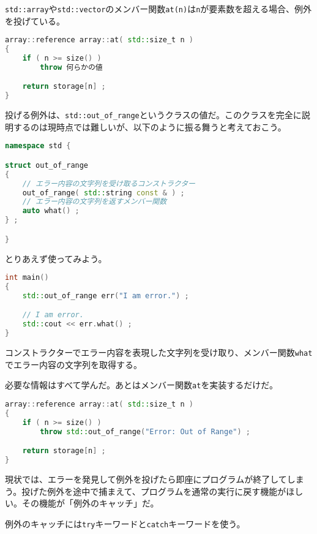 \texttt{std::array}や\texttt{std::vector}のメンバー関数\texttt{at(n)}は\texttt{n}が要素数を超える場合、例外を投げている。

\begin{lstlisting}[language={C++}]
array::reference array::at( std::size_t n )
{
    if ( n >= size() )
        throw 何らかの値

    return storage[n] ;
}
\end{lstlisting}

投げる例外は、\texttt{std::out\_of\_range}というクラスの値だ。このクラスを完全に説明するのは現時点では難しいが、以下のように振る舞うと考えておこう。

\begin{lstlisting}[language={C++}]
namespace std {

struct out_of_range
{
    // エラー内容の文字列を受け取るコンストラクター
    out_of_range( std::string const & ) ;
    // エラー内容の文字列を返すメンバー関数
    auto what() ;
} ;

}
\end{lstlisting}

とりあえず使ってみよう。

\begin{lstlisting}[language={C++}]
int main()
{
    std::out_of_range err("I am error.") ;

    // I am error.
    std::cout << err.what() ;
}
\end{lstlisting}

コンストラクターでエラー内容を表現した文字列を受け取り、メンバー関数\texttt{what}でエラー内容の文字列を取得する。

必要な情報はすべて学んだ。あとはメンバー関数\texttt{at}を実装するだけだ。

\begin{lstlisting}[language={C++}]
array::reference array::at( std::size_t n )
{
    if ( n >= size() )
        throw std::out_of_range("Error: Out of Range") ;

    return storage[n] ;
}
\end{lstlisting}

\clearpage
{}

現状では、エラーを発見して例外を投げたら即座にプログラムが終了してしまう。投げた例外を途中で捕まえて、プログラムを通常の実行に戻す機能がほしい。その機能が「例外のキャッチ」だ。

例外のキャッチには\texttt{try}キーワードと\texttt{catch}キーワードを使う。

